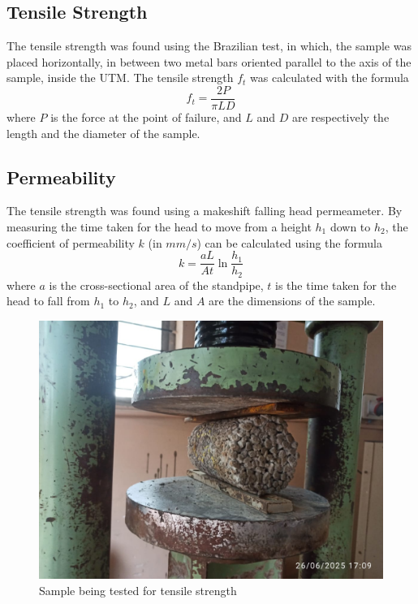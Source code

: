 \documentclass{ieeeaccess}
\begin{document}
\subsection{Tensile Strength}
The tensile strength was found using the Brazilian test, in which, the sample
was placed horizontally, in between two metal bars oriented parallel to the axis
of the sample, inside the UTM. The tensile strength $f_t$ was calculated with
the formula \[f_t = \frac{2P}{\pi LD}\] where $P$ is the force at the point of
failure, and $L$ and $D$ are respectively the length and the diameter of the
sample.

\subsection{Permeability}
The tensile strength was found using a makeshift falling head permeameter.
By measuring the time taken for the head to move from a height $h_1$ down to
$h_2$, the coefficient of permeability $k$ (in $mm/s$) can be calculated using
the formula \[k = \frac{aL}{At} \ln{\frac{h_1}{h_2}}\] where $a$ is the
cross-sectional area of the standpipe, $t$ is the time taken for the head to
fall from $h_1$ to $h_2$, and $L$ and $A$ are the dimensions of the sample.

\begin{figure}[h]
    \caption{Sample being tested for tensile strength}
    \centering
    \includegraphics[scale=0.15]{tensile}
\end{figure}
\end{document}
